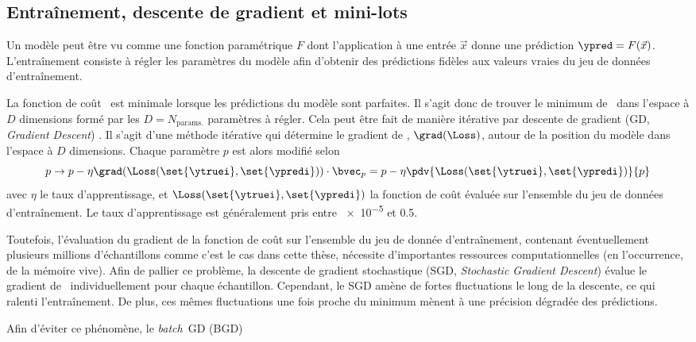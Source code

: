 \subsection{Entraînement, descente de gradient et mini-lots}\label{chapter-ML-section-gradient_descent}
Un modèle peut être vu comme une fonction paramétrique $F$
dont l'application à une entrée $\vec{x}$
donne une prédiction $\ypred=F(\vec{x})$.
L'entraînement consiste à régler les paramètres du modèle
afin d'obtenir des prédictions fidèles aux valeurs vraies du jeu de données d'entraînement.
\par
La fonction de coût \Loss\ est minimale lorsque les prédictions du modèle sont parfaites.
Il s'agit donc de trouver le minimum de \Loss\ dans l'espace à $D$ dimensions formé par les $D=N_\text{params.}$ paramètres à régler.
Cela peut être fait de manière itérative par descente de gradient (GD, \emph{Gradient Descent}) \cite{cauchy_1847}.
Il s'agit d'une méthode itérative qui détermine le gradient de \Loss, $\grad(\Loss)$, autour de la \og position \fg{} du modèle dans l'espace à $D$ dimensions.
Chaque paramètre $p$ est alors modifié selon
\begin{equation}
p \to p - \eta \grad(\Loss(\set{\ytruei}, \set{\ypredi})) \cdot \bvec_p = p - \eta \pdv{\Loss(\set{\ytruei}, \set{\ypredi})}{p}
\end{equation}
avec $\eta$ le taux d'apprentissage,
et
$\Loss(\set{\ytruei}, \set{\ypredi})$
la fonction de coût évaluée sur l'ensemble du jeu de données d'entraînement.
Le taux d'apprentissage est généralement pris entre \num{e-5} et \num{0.5}.
\par
Toutefois, l'évaluation du gradient de la fonction de coût sur l'ensemble du jeu de donnée d'entraînement,
contenant éventuellement plusieurs millions d'échantillons comme c'est le cas dans cette thèse,
nécessite d'importantes ressources computationnelles (en l'occurrence, de la mémoire vive).
Afin de pallier ce problème,
la descente de gradient stochastique (SGD, \emph{Stochastic Gradient Descent})
évalue le gradient de \Loss\ individuellement pour chaque échantillon.
Cependant, le SGD amène de fortes fluctuations le long de la descente,
ce qui ralenti l'entraînement.
De plus, ces mêmes fluctuations une fois proche du minimum mènent à une précision dégradée des prédictions.
\par
Afin d'éviter ce phénomène,
le \emph{batch}~GD (BGD) \cite{SGD}
